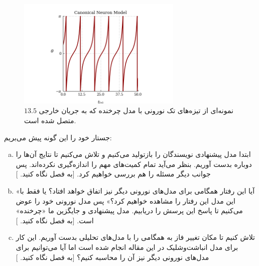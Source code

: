 \begin{figure}
	\centering
	\includegraphics[width=0.7\textwidth]{Figures/canonical_model_spike_pattern.png}
	\caption{
		نمونه‌ای از تیزه‌های تک نورونی با مدل چرخنده که به جریان خارجی
$13.5$
 متصل شده است.}
	\label{fig:canonical_model_spike_pattern}
\end{figure}

جستار خود را این گونه پیش می‌بریم:
\begin{enumerate}[(a)]
	\item
	ابتدا مدل پیشنهادی نویسندگان \cite{PhysRevLett.105.158104} را بازتولید می‌کنیم و تلاش می‌کنیم تا نتایج آن‌ها را دوباره بدست آوریم. بنظر می‌آید تمام کمیت‌های مهم را اندازه‌گیری نکرده‌اند. پس جوانب دیگر مسئله را هم بررسی خواهیم کرد. [به فصل 
	نگاه کنید.
	]
	\item 
	«آیا این رفتار همگامی برای مدل‌های نورونی دیگر نیز اتفاق خواهد افتاد؟ یا فقط با این مدل این رفتار را مشاهده خواهیم کرد؟» پس مدل نورونی خود را عوض می‌کنیم تا پاسخ این پرسش را دریابیم. مدل پیشنهادی و جایگزین ما «چرخنده» است. [به فصل 
	نگاه کنید.
	]
	\item 
	تلاش کنیم تا مکان تغییر فاز به همگامی را با مدل‌های تحلیلی بدست آوریم. این کار برای مدل انباشت‌وشلیک در این مقاله 
	\cite{brunel2000dynamics}
	انجام شده است اما آیا می‌توانیم برای مدل‌های نورونی دیگر نیز آن را محاسبه کنیم؟ [به فصل 
	نگاه کنید.
	]
\end{enumerate}
